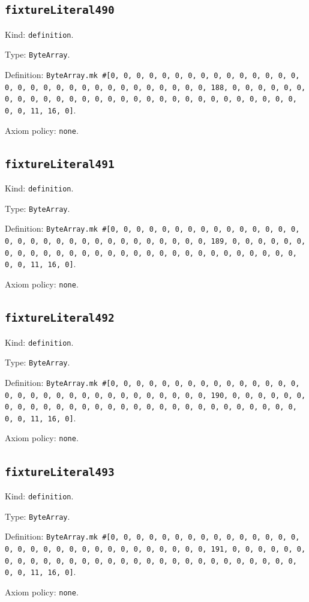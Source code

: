 \documentclass[11pt]{article}
\begin{document}
\subsection*{\texttt{fixtureLiteral490}}
\noindent Kind: \texttt{definition}.\par
\noindent Type: \texttt{ByteArray}.\par
\noindent Definition: \texttt{ByteArray.mk \#[0, 0, 0, 0, 0, 0, 0, 0, 0, 0, 0, 0, 0, 0, 0, 0, 0, 0, 0, 0, 0, 0, 0, 0, 0, 0, 0, 0, 0, 0, 0, 188, 0, 0, 0, 0, 0, 0, 0, 0, 0, 0, 0, 0, 0, 0, 0, 0, 0, 0, 0, 0, 0, 0, 0, 0, 0, 0, 0, 0, 0, 0, 0, 11, 16, 0]}.\par
\noindent Axiom policy: \texttt{none}.\par
\subsection*{\texttt{fixtureLiteral491}}
\noindent Kind: \texttt{definition}.\par
\noindent Type: \texttt{ByteArray}.\par
\noindent Definition: \texttt{ByteArray.mk \#[0, 0, 0, 0, 0, 0, 0, 0, 0, 0, 0, 0, 0, 0, 0, 0, 0, 0, 0, 0, 0, 0, 0, 0, 0, 0, 0, 0, 0, 0, 0, 189, 0, 0, 0, 0, 0, 0, 0, 0, 0, 0, 0, 0, 0, 0, 0, 0, 0, 0, 0, 0, 0, 0, 0, 0, 0, 0, 0, 0, 0, 0, 0, 11, 16, 0]}.\par
\noindent Axiom policy: \texttt{none}.\par
\subsection*{\texttt{fixtureLiteral492}}
\noindent Kind: \texttt{definition}.\par
\noindent Type: \texttt{ByteArray}.\par
\noindent Definition: \texttt{ByteArray.mk \#[0, 0, 0, 0, 0, 0, 0, 0, 0, 0, 0, 0, 0, 0, 0, 0, 0, 0, 0, 0, 0, 0, 0, 0, 0, 0, 0, 0, 0, 0, 0, 190, 0, 0, 0, 0, 0, 0, 0, 0, 0, 0, 0, 0, 0, 0, 0, 0, 0, 0, 0, 0, 0, 0, 0, 0, 0, 0, 0, 0, 0, 0, 0, 11, 16, 0]}.\par
\noindent Axiom policy: \texttt{none}.\par
\subsection*{\texttt{fixtureLiteral493}}
\noindent Kind: \texttt{definition}.\par
\noindent Type: \texttt{ByteArray}.\par
\noindent Definition: \texttt{ByteArray.mk \#[0, 0, 0, 0, 0, 0, 0, 0, 0, 0, 0, 0, 0, 0, 0, 0, 0, 0, 0, 0, 0, 0, 0, 0, 0, 0, 0, 0, 0, 0, 0, 191, 0, 0, 0, 0, 0, 0, 0, 0, 0, 0, 0, 0, 0, 0, 0, 0, 0, 0, 0, 0, 0, 0, 0, 0, 0, 0, 0, 0, 0, 0, 0, 11, 16, 0]}.\par
\noindent Axiom policy: \texttt{none}.\par
\end{document}

